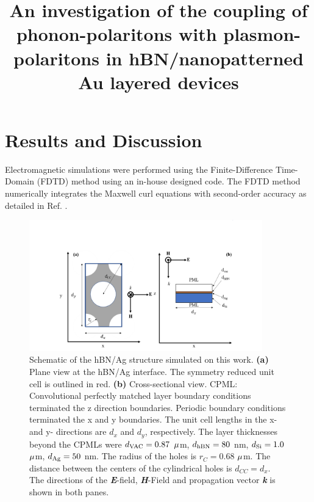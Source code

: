 \documentclass[
peprint,
amsmath,amssymb,
aip,
jap,
floatfix,
]{revtex4-2}
\begin{document}
 


  \title{An investigation of the coupling of phonon-polaritons with plasmon-polaritons in hBN/nanopatterned Au layered devices}
  \maketitle
  \section{Results and Discussion}
  \label{sec:RnD}
  	Electromagnetic simulations were performed using the Finite-Difference Time-Domain (FDTD) method \cite{Kane:66} using an in-house designed code. The FDTD method numerically integrates the Maxwell curl equations with second-order accuracy as detailed in Ref. \cite{Taflove:05}.

      \begin{figure}[!htb]
        \centering\includegraphics[width=0.9\textwidth]{FiguresCh4/StructurehBNAgHex.png}
        \caption{Schematic of the hBN/Ag structure simulated on this work. \textbf{(a)} Plane view at the hBN/Ag interface. The symmetry reduced unit cell is outlined in red. \textbf{(b)} Cross-sectional view. CPML: Convolutional perfectly matched layer boundary conditions terminated the z direction boundaries. Periodic boundary conditions terminated the x and y boundaries. The unit cell lengths in the x- and y- directions are $d_{x} $ and $d_{y}$, respectively. The layer thicknesses beyond the CPMLs were $d_{\rm{VAC}} = 0.87$ $\rm \mu$m, $d_{\rm{hBN}} = 80$ nm, $d_{\rm{Si}} = 1.0$ $\rm \mu$m, $d_{\rm{Ag}} = 50$ nm. The radius of the holes is $r_{C} = 0.68$ $\rm \mu$m. The distance between the centers of the cylindrical holes is $d_{CC} = d_{x} $. The directions of the \textbf{\textit{E}}-field, \textbf{\textit{H}}-Field and propagation vector \textbf{\textit{k}} is shown in both panes.}
        \label{fig:1}
      \end{figure}
\end{document}
